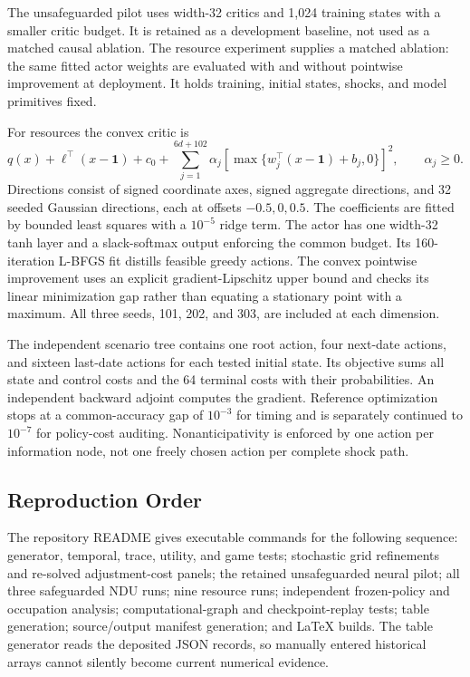 The unsafeguarded pilot uses width-32 critics and 1,024 training states with a smaller critic budget. It is retained as a development baseline, not used as a matched causal ablation. The resource experiment supplies a matched ablation: the same fitted actor weights are evaluated with and without pointwise improvement at deployment. It holds training, initial states, shocks, and model primitives fixed.

For resources the convex critic is
\[
 q(x)+\ell^\top(x-\mathbf1)+c_0+
 \sum_{j=1}^{6d+102}\alpha_j[\max\{w_j^\top(x-\mathbf1)+b_j,0\}]^2,
 \qquad\alpha_j\geq0.
\]
Directions consist of signed coordinate axes, signed aggregate directions, and 32 seeded Gaussian directions, each at offsets $-0.5,0,0.5$. The coefficients are fitted by bounded least squares with a $10^{-5}$ ridge term. The actor has one width-32 tanh layer and a slack-softmax output enforcing the common budget. Its 160-iteration L-BFGS fit distills feasible greedy actions. The convex pointwise improvement uses an explicit gradient-Lipschitz upper bound and checks its linear minimization gap rather than equating a stationary point with a maximum. All three seeds, 101, 202, and 303, are included at each dimension.



The independent scenario tree contains one root action, four next-date actions, and sixteen last-date actions for each tested initial state. Its objective sums all state and control costs and the 64 terminal costs with their probabilities. An independent backward adjoint computes the gradient. Reference optimization stops at a common-accuracy gap of $10^{-3}$ for timing and is separately continued to $10^{-7}$ for policy-cost auditing. Nonanticipativity is enforced by one action per information node, not one freely chosen action per complete shock path.

\subsection{Reproduction Order}
The repository README gives executable commands for the following sequence: generator, temporal, trace, utility, and game tests; stochastic grid refinements and re-solved adjustment-cost panels; the retained unsafeguarded neural pilot; all three safeguarded NDU runs; nine resource runs; independent frozen-policy and occupation analysis; computational-graph and checkpoint-replay tests; table generation; source/output manifest generation; and LaTeX builds. The table generator reads the deposited JSON records, so manually entered historical arrays cannot silently become current numerical evidence.

